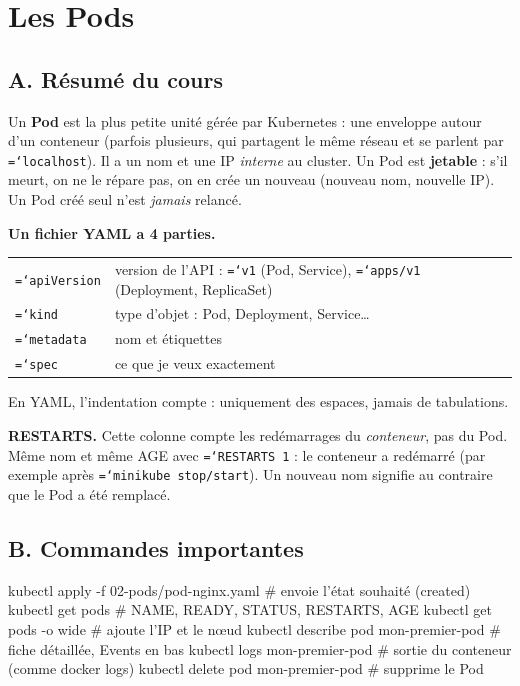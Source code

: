 \documentclass[11pt,a4paper]{article}
\newcommand{\cmd}[1]{\texttt{\hyphenchar\font=`\-#1}}
\newcommand{\partie}[1]{\needspace{9\baselineskip}\subsection*{#1}}
\begin{document}
\section{Les Pods}

\partie{A. Résumé du cours}
Un \textbf{Pod} est la plus petite unité gérée par Kubernetes : une enveloppe autour d'un conteneur (parfois plusieurs, qui partagent le même réseau et se parlent par \cmd{localhost}).
Il a un nom et une IP \emph{interne} au cluster.
Un Pod est \textbf{jetable} : s'il meurt, on ne le répare pas, on en crée un nouveau (nouveau nom, nouvelle IP). Un Pod créé seul n'est \emph{jamais} relancé.

\textbf{Un fichier YAML a 4 parties.}
\begin{center}
\begin{tabularx}{0.9\linewidth}{@{}lX@{}}
\toprule
\cmd{apiVersion} & version de l'API : \cmd{v1} (Pod, Service), \cmd{apps/v1} (Deployment, ReplicaSet) \\
\cmd{kind} & type d'objet : Pod, Deployment, Service\ldots \\
\cmd{metadata} & nom et étiquettes \\
\cmd{spec} & ce que je veux exactement \\
\bottomrule
\end{tabularx}
\end{center}
En YAML, l'indentation compte : uniquement des espaces, jamais de tabulations.

\textbf{RESTARTS.} Cette colonne compte les redémarrages du \emph{conteneur}, pas du Pod. Même nom et même AGE avec \cmd{RESTARTS 1} : le conteneur a redémarré (par exemple après \cmd{minikube stop/start}). Un nouveau nom signifie au contraire que le Pod a été remplacé.

\partie{B. Commandes importantes}
\begin{code}
kubectl apply -f 02-pods/pod-nginx.yaml   # envoie l'état souhaité (created)
kubectl get pods                          # NAME, READY, STATUS, RESTARTS, AGE
kubectl get pods -o wide                  # ajoute l'IP et le nœud
kubectl describe pod mon-premier-pod      # fiche détaillée, Events en bas
kubectl logs mon-premier-pod              # sortie du conteneur (comme docker logs)
kubectl delete pod mon-premier-pod        # supprime le Pod
\end{code}
\end{document}

